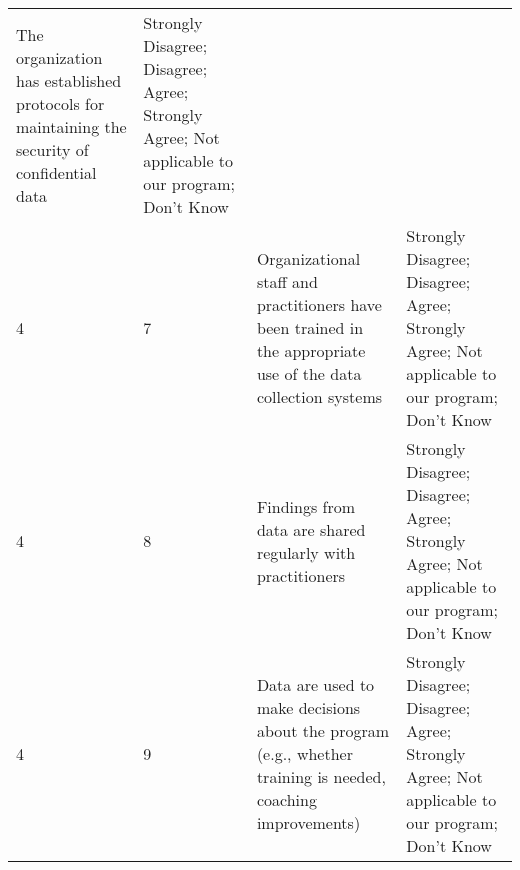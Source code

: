 \documentclass[]{article}
\begin{document}
\begin{longtable}[]{@{}llll@{}}
\begin{minipage}[t]{0.41\columnwidth}
The organization has established protocols for maintaining the security
of confidential data\strut
\end{minipage} & \begin{minipage}[t]{0.39\columnwidth}\raggedright\strut
Strongly Disagree; Disagree; Agree; Strongly Agree; Not applicable to
our program; Don't Know\strut
\end{minipage}\tabularnewline
\begin{minipage}[t]{0.05\columnwidth}\raggedright\strut
4\strut
\end{minipage} & \begin{minipage}[t]{0.04\columnwidth}\raggedright\strut
7\strut
\end{minipage} & \begin{minipage}[t]{0.41\columnwidth}\raggedright\strut
Organizational staff and practitioners have been trained in the
appropriate use of the data collection systems\strut
\end{minipage} & \begin{minipage}[t]{0.39\columnwidth}\raggedright\strut
Strongly Disagree; Disagree; Agree; Strongly Agree; Not applicable to
our program; Don't Know\strut
\end{minipage}\tabularnewline
\begin{minipage}[t]{0.05\columnwidth}\raggedright\strut
4\strut
\end{minipage} & \begin{minipage}[t]{0.04\columnwidth}\raggedright\strut
8\strut
\end{minipage} & \begin{minipage}[t]{0.41\columnwidth}\raggedright\strut
Findings from data are shared regularly with practitioners\strut
\end{minipage} & \begin{minipage}[t]{0.39\columnwidth}\raggedright\strut
Strongly Disagree; Disagree; Agree; Strongly Agree; Not applicable to
our program; Don't Know\strut
\end{minipage}\tabularnewline
\begin{minipage}[t]{0.05\columnwidth}\raggedright\strut
4\strut
\end{minipage} & \begin{minipage}[t]{0.04\columnwidth}\raggedright\strut
9\strut
\end{minipage} & \begin{minipage}[t]{0.41\columnwidth}\raggedright\strut
Data are used to make decisions about the program (e.g., whether
training is needed, coaching improvements)\strut
\end{minipage} & \begin{minipage}[t]{0.39\columnwidth}\raggedright\strut
Strongly Disagree; Disagree; Agree; Strongly Agree; Not applicable to
our program; Don't Know\strut
\end{minipage}\tabularnewline
\bottomrule
\end{longtable}
\end{document}
